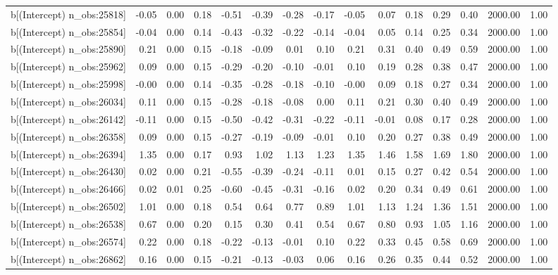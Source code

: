\begin{table}[ht]
\begin{tabular}{rrrrrrrrrrrrrrr}
  b[(Intercept) n\_obs:25818] & -0.05 & 0.00 & 0.18 & -0.51 & -0.39 & -0.28 & -0.17 & -0.05 & 0.07 & 0.18 & 0.29 & 0.40 & 2000.00 & 1.00 \\ 
  b[(Intercept) n\_obs:25854] & -0.04 & 0.00 & 0.14 & -0.43 & -0.32 & -0.22 & -0.14 & -0.04 & 0.05 & 0.14 & 0.25 & 0.34 & 2000.00 & 1.00 \\ 
  b[(Intercept) n\_obs:25890] & 0.21 & 0.00 & 0.15 & -0.18 & -0.09 & 0.01 & 0.10 & 0.21 & 0.31 & 0.40 & 0.49 & 0.59 & 2000.00 & 1.00 \\ 
  b[(Intercept) n\_obs:25962] & 0.09 & 0.00 & 0.15 & -0.29 & -0.20 & -0.10 & -0.01 & 0.10 & 0.19 & 0.28 & 0.38 & 0.47 & 2000.00 & 1.00 \\ 
  b[(Intercept) n\_obs:25998] & -0.00 & 0.00 & 0.14 & -0.35 & -0.28 & -0.18 & -0.10 & -0.00 & 0.09 & 0.18 & 0.27 & 0.34 & 2000.00 & 1.00 \\ 
  b[(Intercept) n\_obs:26034] & 0.11 & 0.00 & 0.15 & -0.28 & -0.18 & -0.08 & 0.00 & 0.11 & 0.21 & 0.30 & 0.40 & 0.49 & 2000.00 & 1.00 \\ 
  b[(Intercept) n\_obs:26142] & -0.11 & 0.00 & 0.15 & -0.50 & -0.42 & -0.31 & -0.22 & -0.11 & -0.01 & 0.08 & 0.17 & 0.28 & 2000.00 & 1.00 \\ 
  b[(Intercept) n\_obs:26358] & 0.09 & 0.00 & 0.15 & -0.27 & -0.19 & -0.09 & -0.01 & 0.10 & 0.20 & 0.27 & 0.38 & 0.49 & 2000.00 & 1.00 \\ 
  b[(Intercept) n\_obs:26394] & 1.35 & 0.00 & 0.17 & 0.93 & 1.02 & 1.13 & 1.23 & 1.35 & 1.46 & 1.58 & 1.69 & 1.80 & 2000.00 & 1.00 \\ 
  b[(Intercept) n\_obs:26430] & 0.02 & 0.00 & 0.21 & -0.55 & -0.39 & -0.24 & -0.11 & 0.01 & 0.15 & 0.27 & 0.42 & 0.54 & 2000.00 & 1.00 \\ 
  b[(Intercept) n\_obs:26466] & 0.02 & 0.01 & 0.25 & -0.60 & -0.45 & -0.31 & -0.16 & 0.02 & 0.20 & 0.34 & 0.49 & 0.61 & 2000.00 & 1.00 \\ 
  b[(Intercept) n\_obs:26502] & 1.01 & 0.00 & 0.18 & 0.54 & 0.64 & 0.77 & 0.89 & 1.01 & 1.13 & 1.24 & 1.36 & 1.51 & 2000.00 & 1.00 \\ 
  b[(Intercept) n\_obs:26538] & 0.67 & 0.00 & 0.20 & 0.15 & 0.30 & 0.41 & 0.54 & 0.67 & 0.80 & 0.93 & 1.05 & 1.16 & 2000.00 & 1.00 \\ 
  b[(Intercept) n\_obs:26574] & 0.22 & 0.00 & 0.18 & -0.22 & -0.13 & -0.01 & 0.10 & 0.22 & 0.33 & 0.45 & 0.58 & 0.69 & 2000.00 & 1.00 \\ 
  b[(Intercept) n\_obs:26862] & 0.16 & 0.00 & 0.15 & -0.21 & -0.13 & -0.03 & 0.06 & 0.16 & 0.26 & 0.35 & 0.44 & 0.52 & 2000.00 & 1.00 \\ 

\end{tabular}
\end{table}
